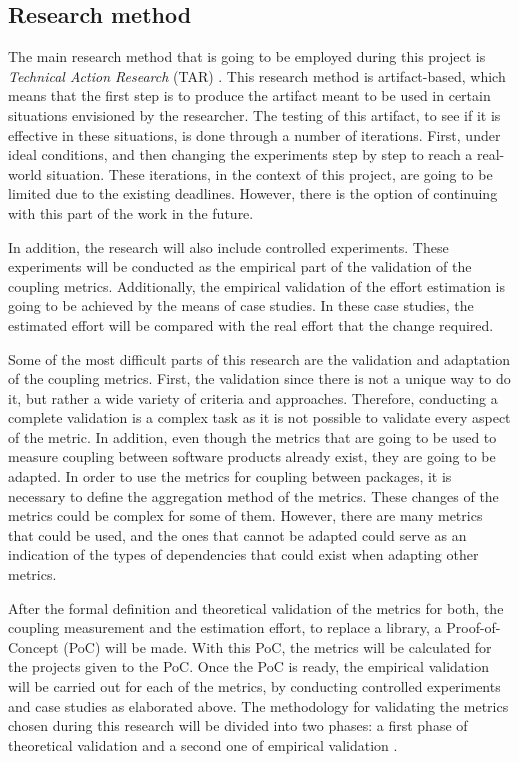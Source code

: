 \subsection{Research method}
The main research method that is going to be employed during this project is \textit{Technical Action Research} (TAR) \cite{wieringa2012technical}.
This research method is artifact-based, which means that the first step is to produce the artifact meant to be used in certain situations envisioned by the researcher. The testing of this artifact, to see if it is effective in these situations, is done through a number of iterations. First, under ideal conditions, and then changing the experiments step by step to reach a real-world situation. These iterations, in the context of this project, are going to be limited due to the existing deadlines. However, there is the option of continuing with this part of the work in the future.

\blankl
In addition, the research will also include controlled experiments. These experiments will be conducted as the empirical part of the validation of the coupling metrics. Additionally, the empirical validation of the effort estimation is going to be achieved by the means of case studies. In these case studies, the estimated effort will be compared with the real effort that the change required.

\blankl
Some of the most difficult parts of this research are the validation and adaptation of the coupling metrics.
First, the validation since there is not a unique way to do it, but rather a wide variety of criteria and approaches. Therefore, conducting a complete validation is a complex task as it is not possible to validate every aspect of the metric.
In addition, even though the metrics that are going to be used to measure coupling between software products already exist, they are going to be adapted. In order to use the metrics for coupling between packages, it is necessary to define the aggregation method of the metrics. These changes of the metrics could be complex for some of them. However, there are many metrics that could be used, and the ones that cannot be adapted could serve as an indication of the types of dependencies that could exist when adapting other metrics.

\blankl
After the formal definition and theoretical validation of the metrics for both, the coupling measurement and the estimation effort, to replace a library, a Proof-of-Concept (PoC) will be made. With this PoC, the metrics will be calculated for the projects given to the PoC. Once the PoC is ready, the empirical validation will be carried out for each of the metrics, by conducting controlled experiments and case studies as elaborated above.
The methodology for validating the metrics chosen during this research will be divided into two phases: a first phase of theoretical validation and a second one of empirical validation \cite{srinivasan2014software}.

